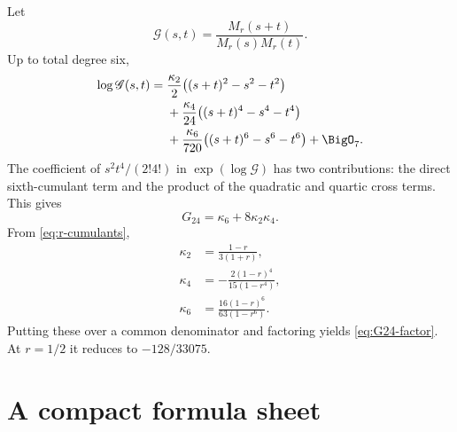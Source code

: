 \documentclass[11pt,a4paper]{article}
\theoremstyle{definition}
\theoremstyle{remark}
\begin{document}
Let
\[
 \mathscr G(s,t)=\frac{M_r(s+t)}{M_r(s)M_r(t)}.
\]
Up to total degree six,
\begin{align*}
 \log\mathscr G(s,t)
 ={}&\frac{\kappa_2}{2}\bigl((s+t)^2-s^2-t^2\bigr)\\
 &+\frac{\kappa_4}{24}\bigl((s+t)^4-s^4-t^4\bigr)\\
 &+\frac{\kappa_6}{720}\bigl((s+t)^6-s^6-t^6\bigr)+\BigO_7.
\end{align*}
The coefficient of $s^2t^4/(2!4!)$ in $\exp(\log\mathscr G)$ has two contributions: the direct sixth-cumulant term and the product of the quadratic and quartic cross terms. This gives
\[
 G_{24}=\kappa_6+8\kappa_2\kappa_4.
\]
From \eqref{eq:r-cumulants},
\begin{align*}
 \kappa_2&=\frac{1-r}{3(1+r)},\\
 \kappa_4&=-\frac{2(1-r)^4}{15(1-r^4)},\\
 \kappa_6&=\frac{16(1-r)^6}{63(1-r^6)}.
\end{align*}
Putting these over a common denominator and factoring yields \eqref{eq:G24-factor}. At $r=1/2$ it reduces to $-128/33075$.

\section{A compact formula sheet}
\label{app:formula-sheet}
\end{document}

